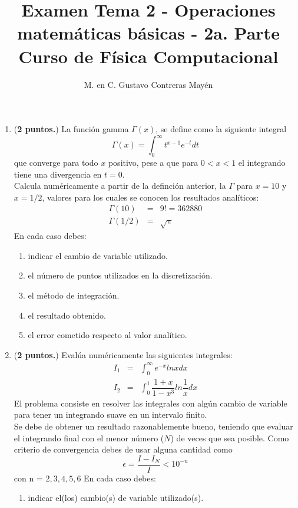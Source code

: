 \documentclass[11pt]{article}
\title{Examen Tema 2 - Operaciones matem\'{a}ticas b\'{a}sicas - 2a. Parte \\ Curso de Física Computacional}
\author{M. en C. Gustavo Contreras May\'{e}n}
\date{ }
\begin{document}
\maketitle
\fontsize{14}{14}\selectfont
\begin{enumerate}
	\item (\textbf{2 puntos.}) La funci\'{o}n gamma $\Gamma (x)$, se define como la siguiente integral
	\[ \Gamma (x) = \int_{0}^{\infty} t^{x-1} e^{-t} dt\]
	que converge para todo $x$ positivo, pese a que para $0<x<1$ el integrando tiene una divergencia en $t=0$.
	\\
	Calcula num\'{e}ricamente a partir de la definci\'{o}n anterior, la $\Gamma$ para $x=10$ y $x=1/2$, valores para los cuales se conocen los resultados anal\'{i}ticos:
	\begin{eqnarray*}
		\Gamma(10) &=& 9! = 362880 \\
		\Gamma(1/2) &=& \sqrt{\pi}
	\end{eqnarray*}
	En cada caso debes:
	\begin{enumerate}
		\item indicar el cambio de variable utilizado.
		\item el n\'{u}mero de puntos utilizados en la discretizaci\'{o}n.
		\item el m\'{e}todo de integraci\'{o}n.
		\item el resultado obtenido.
		\item el error cometido respecto al valor anal\'{i}tico.
	\end{enumerate}
	\item (\textbf{2 puntos.}) Eval\'{u}a num\'{e}ricamente las siguientes integrales:
	\begin{eqnarray*}
		I_{1} &=& \int_{0}^{\infty} e^{-x} ln x dx \\
		I_{2} &=& \int_{0}^{1} \dfrac{1+x}{1-x^{3}} ln\dfrac{1}{x} dx
	\end{eqnarray*}
	El problema consiste en resolver las integrales con alg\'{u}n cambio de variable para tener un integrando suave en un intervalo finito.
	\\
	Se debe de obtener un resultado razonablemente bueno, teniendo que evaluar el integrando final con el menor n\'{u}mero ($N$) de veces que sea posible. Como criterio de convergencia debes de usar alguna cantidad como
	\[ \epsilon = \dfrac{I - I_{N}}{I} < 10^{-n}\]
	con n = $2,3,4,5,6$
	En cada caso debes:
	\begin{enumerate}
		\item indicar el(los) cambio(s) de variable utilizado(s).

\end{enumerate}
\end{enumerate}
\end{document}
